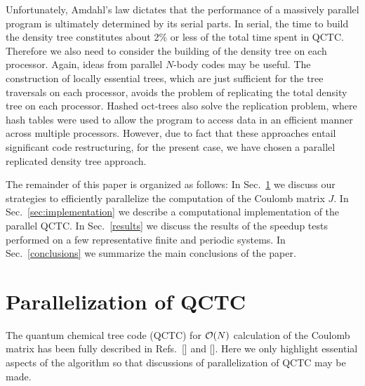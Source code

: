 \commentoutA{\documentclass[prl,aps,twocolumn,twocolumngrid,superbib]{revtex4}}
\begin{document}
Unfortunately, Amdahl's law dictates that the performance of a
massively parallel program is ultimately determined by its serial
parts.  In serial, the time to build the density tree constitutes
about 2\% or less of the total time spent in QCTC.  Therefore we also
need to consider the building of the density tree on each processor.
Again, ideas from parallel $N$-body codes may be useful.  The
construction of locally essential trees, which are just sufficient for
the tree traversals on each processor,\cite{MWarren92} avoids the
problem of replicating the total density tree on each processor.
Hashed oct-trees\cite{MWarren93,MWarren95b} also solve the replication
problem, where hash tables were used to allow the program to access
data in an efficient manner across multiple processors. However, due
to fact that these approaches entail significant code restructuring,
for the present case, we have chosen a parallel replicated density
tree approach.

The remainder of this paper is organized as follows: In
Sec.~\ref{ParaQCTC} we discuss our strategies to efficiently
parallelize the computation of the Coulomb matrix $J$. In
Sec.~\ref{sec:implementation} we describe a computational
implementation of the parallel QCTC. In Sec.~\ref{results} we discuss
the results of the speedup tests performed on a few representative
finite and periodic systems. In Sec.~\ref{conclusions} we summarize
the main conclusions of the paper.

\section{Parallelization of QCTC}
\label{ParaQCTC}
The quantum chemical tree code (QCTC) for ${\cal O}(N)$ calculation of
the Coulomb matrix has been fully described in
Refs.~[] and [].
Here we only highlight essential aspects of the algorithm so that
discussions of parallelization of QCTC may be made.
\end{document}
